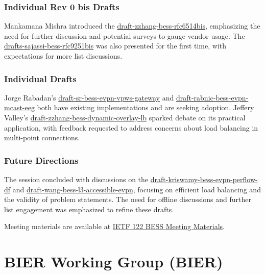 \documentclass{article}
\begin{document}
\subsubsection{Individual Rev 0 bis Drafts}
Mankamana Mishra introduced the \href{https://datatracker.ietf.org/doc/html/draft-zzhang-bess-rfc6514bis}{draft-zzhang-bess-rfc6514bis}, emphasizing the need for further discussion and potential surveys to gauge vendor usage. The \href{https://datatracker.ietf.org/doc/html/drafts-sajassi-bess-rfc9251bis}{drafts-sajassi-bess-rfc9251bis} was also presented for the first time, with expectations for more list discussions.

\subsubsection{Individual Drafts}
Jorge Rabadan's \href{https://datatracker.ietf.org/doc/html/draft-sr-bess-evpn-vpws-gateway}{draft-sr-bess-evpn-vpws-gateway} and \href{https://datatracker.ietf.org/doc/html/draft-rabnic-bess-evpn-mcast-eeg}{draft-rabnic-bess-evpn-mcast-eeg} both have existing implementations and are seeking adoption. Jeffery Valley's \href{https://datatracker.ietf.org/doc/html/draft-zzhang-bess-dynamic-overlay-lb}{draft-zzhang-bess-dynamic-overlay-lb} sparked debate on its practical application, with feedback requested to address concerns about load balancing in multi-point connections.

\subsubsection{Future Directions}
The session concluded with discussions on the \href{https://datatracker.ietf.org/doc/html/draft-kriswamy-bess-evpn-perflow-df}{draft-kriswamy-bess-evpn-perflow-df} and \href{https://datatracker.ietf.org/doc/html/draft-wang-bess-l3-accessible-evpn}{draft-wang-bess-l3-accessible-evpn}, focusing on efficient load balancing and the validity of problem statements. The need for offline discussions and further list engagement was emphasized to refine these drafts.

Meeting materials are available at \href{https://www.ietf.org/proceedings/122/bess.html}{IETF 122 BESS Meeting Materials}.



\newpage

\section{BIER Working Group (BIER)}
\end{document}
